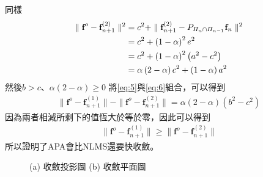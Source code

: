 \documentclass[conference]{IEEEtran}
\begin{document}
    同樣
    \begin{align}\label{eq:6}
        \parallel \textbf{f}^o-\textbf{f}^{\left( 2 \right)}_{n+1} \parallel^2&=c^2+\parallel \textbf{f}^{\left( 2 \right)}_{n+1}-P_{\Pi_n \cap \Pi_{n-1}}\textbf{f}_n\parallel^2 \notag \\
        &=c^2+\left( 1-\alpha \right)^2e^2 \notag \\
        &=c^2+\left( 1-\alpha \right)^2\left( a^2-c^2 \right) \notag \\
        &=\alpha \left( 2-\alpha \right)c^2+\left( 1-\alpha \right)a^2
    \end{align}  
    然後$b>c$、$\alpha\left( 2-\alpha \right) \ge 0$ 將\eqref{eq:5}與\eqref{eq:6}組合，可以得到
    \begin{align}\label{eq:7}
        \parallel \textbf{f}^o-\textbf{f}^{\left( 1 \right)}_{n+1} \parallel-\parallel \textbf{f}^o-\textbf{f}^{\left( 2 \right)}_{n+1} \parallel=\alpha \left( 2-\alpha \right)\left( b^2-c^2 \right)
    \end{align}
    因為兩者相減所剩下的值恆大於等於零，因此可以得到
    \begin{align}\label{eq:8}
        \parallel \textbf{f}^o-\textbf{f}^{\left( 1 \right)}_{n+1} \parallel \geq \parallel \textbf{f}^o-\textbf{f}^{\left( 2 \right)}_{n+1} \parallel
    \end{align}
    所以證明了APA會比NLMS還要快收斂。
    \begin{figure}[h]
        \centering
        \caption{(a) 收斂投影圖 (b) 收斂平面圖}
    \end{figure}
\end{document}
